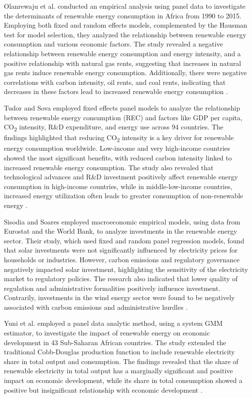\documentclass[a4paper,11pt]{article}
\begin{document}
Olanrewaju et al. conducted an empirical analysis using panel data to investigate the determinants of renewable energy consumption in Africa from 1990 to 2015. Employing both fixed and random effects models, complemented by the Hausman test for model selection, they analyzed the relationship between renewable energy consumption and various economic factors. The study revealed a negative relationship between renewable energy consumption and energy intensity, and a positive relationship with natural gas rents, suggesting that increases in natural gas rents induce renewable energy consumption. Additionally, there were negative correlations with carbon intensity, oil rents, and coal rents, indicating that decreases in these factors lead to increased renewable energy consumption \textcite{ref41}.

Tudor and Sova employed fixed effects panel models to analyze the relationship between renewable energy consumption (REC) and factors like GDP per capita, CO\textsubscript{2} intensity, R\&D expenditure, and energy use across 94 countries. The findings highlighted that reducing CO\textsubscript{2} intensity is a key driver for renewable energy consumption worldwide. Low-income and very high-income countries showed the most significant benefits, with reduced carbon intensity linked to increased renewable energy consumption. The study also revealed that technological advances and R\&D investment positively affect renewable energy consumption in high-income countries, while in middle-low-income countries, increased energy utilization often leads to greater consumption of non-renewable energy \textcite{ref51}.

Sisodia and Soares employed macroeconomic empirical models, using data from Eurostat and the World Bank, to analyze investments in the renewable energy sector. Their study, which used fixed and random panel regression models, found that solar investments were not significantly influenced by electricity prices for households or industries. However, carbon emissions and regulatory governance negatively impacted solar investment, highlighting the sensitivity of the electricity market to regulatory policies. The research also indicated that lower quality of regulation and administrative formalities positively influence investment. Contrarily, investments in the wind energy sector were found to be negatively associated with carbon emissions and administrative hurdles \textcite{ref49}.

Yuni et al. employed a panel data analytic method, using a system GMM estimator, to investigate the impact of renewable energy on economic development in 43 Sub-Saharan African countries. The study extended the traditional Cobb-Douglas production function to include renewable electricity share in total output and consumption. The findings revealed that the share of renewable electricity in total output has a marginally significant and positive impact on economic development, while its share in total consumption showed a positive but insignificant relationship with economic development \textcite{ref54}.
\end{document}
